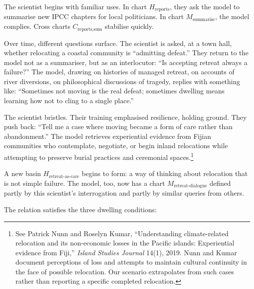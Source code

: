 \documentclass[12pt,a4paper]{article}
\begin{document}
The scientist begins with familiar uses. In chart $H_{\text{reports}}$, they ask the model to summarise new IPCC chapters for local politicians. In chart $M_{\text{summarise}}$, the model complies. Cross charts $C_{\text{reports,sum}}$ stabilise quickly.

Over time, different questions surface. The scientist is asked, at a town hall, whether relocating a coastal community is ``admitting defeat.'' They return to the model not as a summariser, but as an interlocutor: ``Is accepting retreat always a failure?'' The model, drawing on histories of managed retreat, on accounts of river diversions, on philosophical discussions of tragedy, replies with something like: ``Sometimes not moving is the real defeat; sometimes dwelling means learning how not to cling to a single place.''

The scientist bristles. Their training emphasised resilience, holding ground. They push back: ``Tell me a case where moving became a form of care rather than abandonment.'' The model retrieves experiential evidence from Fijian communities who contemplate, negotiate, or begin inland relocations while attempting to preserve burial practices and ceremonial spaces.\footnote{See Patrick Nunn and Roselyn Kumar, ``Understanding climate-related relocation and its non-economic losses in the Pacific islands: Experiential evidence from Fiji,'' \emph{Island Studies Journal} 14(1), 2019. Nunn and Kumar document perceptions of loss and attempts to maintain cultural continuity in the face of possible relocation. Our scenario extrapolates from such cases rather than reporting a specific completed relocation.}

A new basin $H_{\text{retreat-as-care}}$ begins to form: a way of thinking about relocation that is not simple failure. The model, too, now has a chart $M_{\text{retreat-dialogue}}$ defined partly by this scientist's interrogation and partly by similar queries from others.

The relation satisfies the three dwelling conditions:
\end{document}

